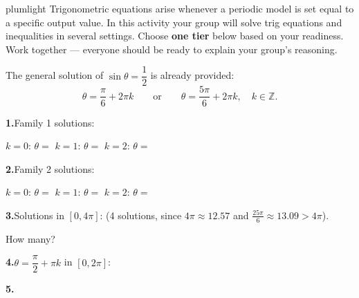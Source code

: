 \documentclass[10pt]{article}
\begin{document}
\namepartnerperiod

\vspace{0.08in}

\begin{scenariobox}{plumlight}
Trigonometric equations arise whenever a periodic model is set equal to
a specific output value. In this activity your group will solve trig
equations and inequalities in several settings. Choose \textbf{one tier}
below based on your readiness. Work together --- everyone should be ready
to explain your group's reasoning.
\end{scenariobox}

\vspace{0.08in}

\begin{tcolorbox}[colback=white, colframe=black!40,
    title=\textbf{Tier R --- Remediate (Key)},
    fonttitle=\bfseries, arc=2mm, left=3mm, right=3mm, top=2mm, bottom=2mm]

The general solution of $\sin\theta = \dfrac{1}{2}$ is already provided:
\[
  \theta = \frac{\pi}{6} + 2\pi k \qquad \text{or} \qquad \theta = \frac{5\pi}{6} + 2\pi k,
  \quad k \in \mathbb{Z}.
\]

\textbf{1.}\quad Family 1 solutions:

$k=0$: $\theta = $  \quad
$k=1$: $\theta = $  \quad
$k=2$: $\theta = $ 

\vspace{0.08in}
\textbf{2.}\quad Family 2 solutions:

$k=0$: $\theta = $  \quad
$k=1$: $\theta = $  \quad
$k=2$: $\theta = $ 

\vspace{0.08in}
\textbf{3.}\quad Solutions in $[0, 4\pi]$:  (4 solutions, since $4\pi \approx 12.57$ and $\tfrac{25\pi}{6} \approx 13.09 > 4\pi$).

How many? 

\vspace{0.08in}
\textbf{4.}\quad $\theta = \dfrac{\pi}{2} + \pi k$ in $[0,2\pi]$:

\vspace{0.08in}
\textbf{5.}\quad {}

\end{tcolorbox}
\end{document}
